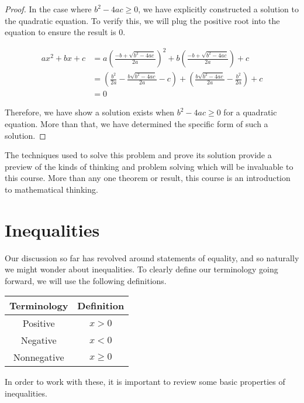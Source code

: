 \documentclass[twoside]{report}
\begin{document}
\begin{proof}
	In the case where $b^2 - 4ac \ge 0$, we have explicitly constructed a solution to the quadratic equation. To verify this, we will plug the positive root into the equation to ensure the result is 0.
	
	\begin{align*}
		ax^2 + bx + c
		&= a \left( \frac{-b + \sqrt{b^2 - 4ac}}{2a} \right)^2 + b \left( \frac{-b + \sqrt{b^2 - 4ac}}{2a} \right) + c \\
		&= \left( \frac{b^2}{2a} - \frac{b\sqrt{b^2 - 4ac}}{2a} - c\right) + \left( \frac{b\sqrt{b^2 - 4ac}}{2a} - \frac{b^2}{2a}\right) + c \\
		&= 0
	\end{align*}
	
	Therefore, we have show a solution exists when  $b^2 - 4ac \ge 0$ for a quadratic equation. More than that, we have determined the specific form of such a solution.
\end{proof}
\vspace{\baselineskip}

The techniques used to solve this problem and prove its solution provide a preview of the kinds of thinking and problem solving which will be invaluable to this course. More than any one theorem or result, this course is an introduction to mathematical thinking.

\section{Inequalities}
Our discussion so far has revolved around statements of equality, and so naturally we might wonder about inequalities. To clearly define our terminology going forward, we will use the following definitions.

\vspace{\baselineskip}
\begin{center}
	\begin{tabular}{cc}
		\toprule
		Terminology & Definition \\
		\midrule
		Positive & $x > 0$ \\
		Negative & $x < 0$ \\
		Nonnegative & $x \ge 0$ \\
		\bottomrule
	\end{tabular}
\end{center}
\vspace{\baselineskip}


In order to work with these, it is important to review some basic properties of inequalities.
\end{document}
